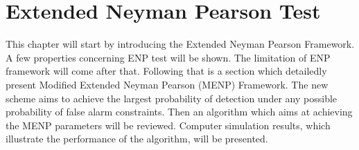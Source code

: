 \chapter{Extended Neyman Pearson Test}

\newcommand{\bom}{\boldsymbol{\omega}}
This chapter will start by introducing the Extended Neyman Pearson Framework. A few properties concerning ENP test will be shown. The limitation of ENP framework will come after that. Following that is a section which detailedly present Modified Extended Neyman Pearson (MENP) Framework. The new scheme aims to achieve the largest probability of detection under any possible probability of false alarm constraints. Then an algorithm which aims at achieving the MENP parameters will be reviewed. Computer simulation results, which illustrate the performance of the algorithm, will be presented. 



\typeout{}


\typeout{}


\typeout{}


\typeout{}


\typeout{}

                     
